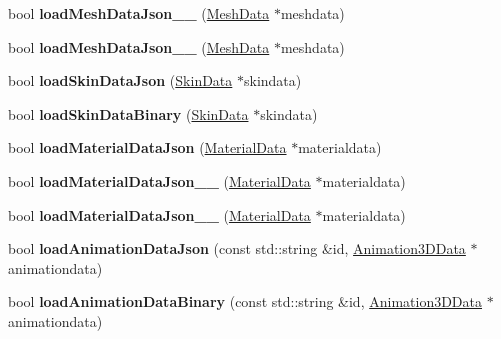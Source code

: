 \begin{DoxyCompactItemize}
\item 
\mbox{\label{classBundle3D_a7460364371642a2a4eb03e8e818b90de}} 
bool {\bfseries load\+Mesh\+Data\+Json\+\_\+\_} (\hyperlink{structMeshData}{Mesh\+Data} $\ast$meshdata)
\item 
\mbox{\label{classBundle3D_a346f5c2e1cefb5bcedc3a85255021aaa}} 
bool {\bfseries load\+Mesh\+Data\+Json\+\_\+\_} (\hyperlink{structMeshData}{Mesh\+Data} $\ast$meshdata)
\item 
\mbox{\label{classBundle3D_a8d937df77ebe15c51619cf31c205443c}} 
bool {\bfseries load\+Skin\+Data\+Json} (\hyperlink{structSkinData}{Skin\+Data} $\ast$skindata)
\item 
\mbox{\label{classBundle3D_ac4db994035a70495cc80bf9c613f0633}} 
bool {\bfseries load\+Skin\+Data\+Binary} (\hyperlink{structSkinData}{Skin\+Data} $\ast$skindata)
\item 
\mbox{\label{classBundle3D_a32705826d8a0f4853a8194b99f897443}} 
bool {\bfseries load\+Material\+Data\+Json} (\hyperlink{structMaterialData}{Material\+Data} $\ast$materialdata)
\item 
\mbox{\label{classBundle3D_a54b6ae8b41c06cafdec15f0935527fad}} 
bool {\bfseries load\+Material\+Data\+Json\+\_\+\_} (\hyperlink{structMaterialData}{Material\+Data} $\ast$materialdata)
\item 
\mbox{\label{classBundle3D_a543832a83f1f45463d611e9390996108}} 
bool {\bfseries load\+Material\+Data\+Json\+\_\+\_} (\hyperlink{structMaterialData}{Material\+Data} $\ast$materialdata)
\item 
\mbox{\label{classBundle3D_ae6586629f1c634ad7f12b32cdd980a3e}} 
bool {\bfseries load\+Animation\+Data\+Json} (const std\+::string \&id, \hyperlink{structAnimation3DData}{Animation3\+D\+Data} $\ast$animationdata)
\item 
\mbox{\label{classBundle3D_ad558daa9851e1fde1f6e036fb27dfb2f}} 
bool {\bfseries load\+Animation\+Data\+Binary} (const std\+::string \&id, \hyperlink{structAnimation3DData}{Animation3\+D\+Data} $\ast$animationdata)

\end{DoxyCompactItemize}
